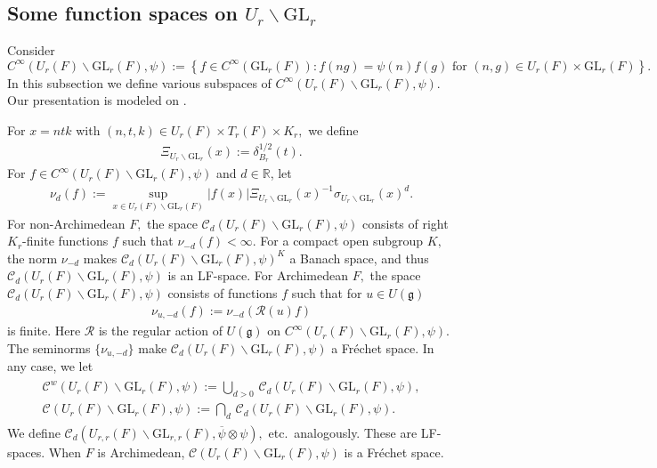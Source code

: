 \documentclass[12pt]{amsart}
\theoremstyle{remark}
\numberwithin{equation}{section}
\newcommand{\GL}{\mathrm{GL}}
\newcommand{\RR}{\mathbb{R}}
\theoremstyle{definition}
\numberwithin{equation}{subsection}
\begin{document}
\subsection{Some function spaces on $U_r\backslash \GL_r$}
  Consider 
$$
C^\infty(U_r(F) \backslash \GL_r(F),\psi):=\left\{f \in C^\infty(\GL_r(F)): f(ng)=\psi(n)f(g) \textrm{ for }(n,g) \in U_r(F) \times \GL_r(F)\right\}.
$$
In this subsection we define various subspaces of $C^\infty(U_r(F) \backslash \GL_r(F),\psi)$. Our presentation  is modeled on \cite[\S 2.4]{BP:GLn}. 
 


For $x=ntk$ with $(n,t,k) \in U_r(F) \times T_r(F) \times K_r,$ we define 
\begin{align*} 
    \Xi_{U_r \backslash \GL_r}(x):=\delta_{B_r}^{1/2}(t).
\end{align*}
For $f\in C^\infty(U_r(F) \backslash \GL_r(F),\psi)$ and $d\in \RR$, let 
\begin{align*} 
    \nu_{d}(f):=\sup_{x\in U_r(F)\backslash \GL_r(F)} |f(x)| \Xi_{U_r \backslash \GL_r}(x)^{-1} \sigma_{U_r\backslash \GL_r}(x)^d.
\end{align*}
 For non-Archimedean $F,$ the space $\mathcal{C}_d(U_r(F)\backslash \GL_r(F),\psi)$ consists of right $K_r$-finite functions $f$ such that $\nu_{-d}(f)<\infty$. For a compact open subgroup $K,$ the norm $\nu_{-d}$ makes $\mathcal{C}_d(U_r(F)\backslash \GL_r(F),\psi)^K$ a Banach space, and thus $\mathcal{C}_d(U_r(F)\backslash \GL_r(F),\psi)$ is an LF-space. For Archimedean $F,$ the space $\mathcal{C}_d(U_r(F)\backslash \GL_r(F),\psi)$ consists of functions $f$ such that for $u\in U(\mathfrak{g})$ 
 \begin{align*}
      \nu_{u,-d}(f):=\nu_{-d}(\mathcal{R}(u)f)
 \end{align*}
 is finite.  Here $\mathcal{R}$ is the regular action of $U(\mathfrak{g})$ on $C^\infty(U_r(F) \backslash \GL_r(F),\psi).$ The seminorms $\{\nu_{u,-d}\}$ make $\mathcal{C}_d(U_r(F)\backslash \GL_r(F),\psi)$ a Fr\'echet space. In any case, we let \index{$\mathcal{C}(U_r(F) \backslash \GL_r(F),\psi)$}
\begin{align*} \begin{split}
\mathcal{C}^w(U_r(F) \backslash \GL_r(F),\psi):=\bigcup_{d>0}\,\mathcal{C}_d(U_r(F) \backslash \GL_r(F),\psi),\\
\mathcal{C}(U_r(F) \backslash \GL_r(F),\psi):=\bigcap_{d}\,\mathcal{C}_d(U_r(F) \backslash \GL_r(F),\psi). \end{split}
\end{align*}
  We define
$\mathcal{C}_d(U_{r,r}(F) \backslash \GL_{r,r}(F),\overline{\psi} \otimes \psi),$ etc.~analogously. These are LF-spaces. When $F$ is Archimedean, $\mathcal{C}(U_r(F) \backslash \GL_r(F),\psi)$ is a Fr\'echet space.
\end{document}
